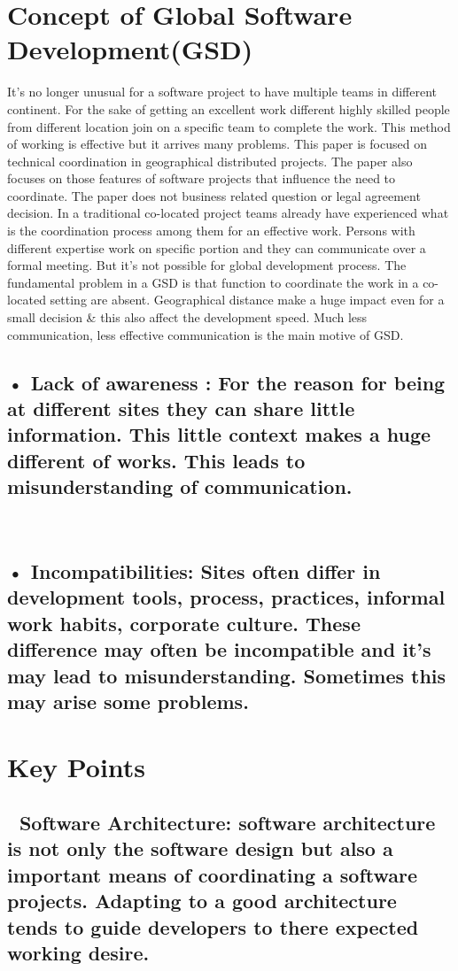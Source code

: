 \documentclass{article}
\begin{document}
\section{Concept of Global Software  Development(GSD)}
It’s no longer unusual for a software project to have multiple teams in different continent. For the sake of getting an excellent work different highly skilled people from different location join on a specific team to complete the work. This method of working is effective but it arrives many problems. This paper is focused on technical coordination in geographical distributed projects. The paper also focuses on those features of software projects that influence the need to coordinate. The paper does not business related question or legal agreement decision. \newline \newline
In a traditional co-located project teams already have experienced what is the coordination process among them for an effective  work. Persons with different expertise work on specific portion and they can communicate over a formal meeting. But it’s not possible for global development process.  The fundamental problem in a GSD is that function to coordinate the work in a co-located setting are absent. Geographical distance make a huge impact even for a small decision & this also affect the development speed. Much less communication, less effective communication is the main motive of GSD. \\
\subsection*{•	Lack of awareness : For the reason for being at different sites they can share little information. This little context makes a huge different of works. This leads to misunderstanding of communication. } \\
\subsection*{•	Incompatibilities: Sites often differ in development tools, process, practices, informal work habits, corporate culture. These difference may often be incompatible and it’s may lead to misunderstanding. Sometimes this may arise some problems. }
\section{Key Points}
\subsection*{	Software Architecture: software architecture is not only the software design but also a important means of coordinating a software projects. Adapting to a good architecture tends to guide developers to there expected working desire. }
\end{document}
